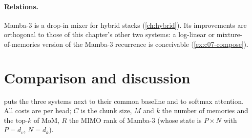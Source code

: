 \paragraph{Relations.} Mamba-3 is a drop-in mixer for hybrid stacks (\cref{ch:hybrid}). Its
improvements are orthogonal to those of this chapter's other two systems: a log-linear or
mixture-of-memories version of the Mamba-3 recurrence is conceivable (\cref{ex:c07-compose}).

\section{Comparison and discussion}\label{sec:c07-comparison}

 puts the three systems next to their common baseline and to softmax
attention. All costs are per head; $C$ is the chunk size, $M$ and $k$ the number of
memories and the top-$k$ of MoM, $R$ the MIMO rank of Mamba-3 (whose state is $P\times N$ with
$P = d_v$, $N = d_k$).


